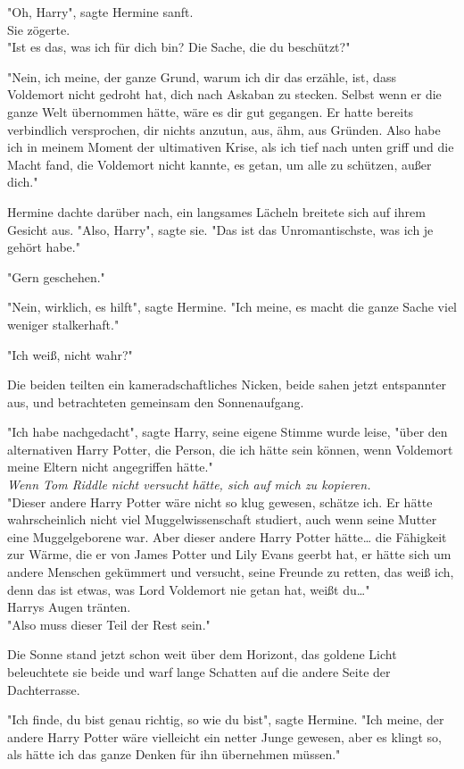 {"Oh, Harry", sagte Hermine sanft.\\ Sie zögerte.\\ "Ist es das, was ich für dich bin? Die Sache, die du beschützt?"

"Nein, ich meine, der ganze Grund, warum ich dir das erzähle, ist, dass Voldemort nicht gedroht hat, dich nach Askaban zu stecken. Selbst wenn er die ganze Welt übernommen hätte, wäre es dir gut gegangen. Er hatte bereits verbindlich versprochen, dir nichts anzutun, aus, ähm, aus Gründen. Also habe ich in meinem Moment der ultimativen Krise, als ich tief nach unten griff und die Macht fand, die Voldemort nicht kannte, es getan, um alle zu schützen, außer dich."

Hermine dachte darüber nach, ein langsames Lächeln breitete sich auf ihrem Gesicht aus. "Also, Harry", sagte sie. "Das ist das Unromantischste, was ich je gehört habe."

"Gern geschehen."

"Nein, wirklich, es hilft", sagte Hermine. "Ich meine, es macht die ganze Sache viel weniger stalkerhaft."

"Ich weiß, nicht wahr?"

Die beiden teilten ein kameradschaftliches Nicken, beide sahen jetzt entspannter aus, und betrachteten gemeinsam den Sonnenaufgang.

"Ich habe nachgedacht", sagte Harry, seine eigene Stimme wurde leise, "über den alternativen Harry Potter, die Person, die ich hätte sein können, wenn Voldemort meine Eltern nicht angegriffen hätte."\\ \emph{Wenn Tom Riddle nicht versucht hätte, sich auf mich zu kopieren.}\\ "Dieser andere Harry Potter wäre nicht so klug gewesen, schätze ich. Er hätte wahrscheinlich nicht viel Muggelwissenschaft studiert, auch wenn seine Mutter eine Muggelgeborene war. Aber dieser andere Harry Potter hätte… die Fähigkeit zur Wärme, die er von James Potter und Lily Evans geerbt hat, er hätte sich um andere Menschen gekümmert und versucht, seine Freunde zu retten, das weiß ich, denn das ist etwas, was Lord Voldemort nie getan hat, weißt du…"\\ Harrys Augen tränten.\\ "Also muss dieser Teil der Rest sein."

Die Sonne stand jetzt schon weit über dem Horizont, das goldene Licht beleuchtete sie beide und warf lange Schatten auf die andere Seite der Dachterrasse.

"Ich finde, du bist genau richtig, so wie du bist", sagte Hermine. "Ich meine, der andere Harry Potter wäre vielleicht ein netter Junge gewesen, aber es klingt so, als hätte ich das ganze Denken für ihn übernehmen müssen."

}
